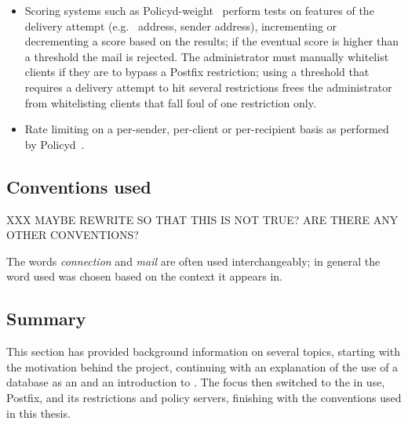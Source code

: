 \begin{itemize}
        \begin{table}[ht]
            \caption{Summary of rejections}\label{Summary of rejections}
            
        \end{table}

    \item Scoring systems such as Policyd-weight~\cite{policyd-weight}
        perform tests on features of the delivery attempt (e.g.\ \IP{}
        address, sender address), incrementing or decrementing a score
        based on the results; if the eventual score is higher than a
        threshold the mail is rejected.  The administrator must manually
        whitelist clients if they are to bypass a Postfix restriction;
        using a threshold that requires a delivery attempt to hit several
        restrictions frees the administrator from whitelisting clients that
        fall foul of one restriction only.

    \item Rate limiting on a per-sender, per-client or per-recipient basis
        as performed by Policyd~\cite{policyd}.

\end{itemize}



\subsection{Conventions used}

XXX MAYBE REWRITE SO THAT THIS IS NOT TRUE\@?  ARE THERE ANY OTHER
CONVENTIONS\@?

The words \textit{connection\/} and \textit{mail\/} are often used
interchangeably; in general the word used was chosen based
on the context it appears in.

\subsection{Summary}

This section has provided background information on several topics,
starting with the motivation behind the project, continuing with an
explanation of the use of a database as an \API{} and an introduction to
\SMTP{}.  The focus then switched to the \MTA{} in use, Postfix, and its
restrictions and policy servers, finishing with the conventions used in
this thesis.
